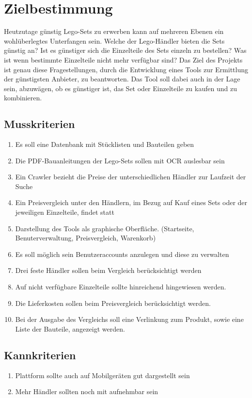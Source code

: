 \section{Zielbestimmung}

Heutzutage günstig Lego-Sets zu erwerben kann auf mehreren Ebenen ein wohlüberlegtes Unterfangen sein. Welche der Lego-Händler bieten die Sets günstig an? Ist es günstiger sich die Einzelteile des Sets einzeln zu bestellen? Was ist wenn bestimmte Einzelteile nicht mehr verfügbar sind? \newline
Das Ziel des Projekts ist genau diese Fragestellungen, durch die Entwicklung eines Tools zur Ermittlung der günstigsten Anbieter, zu beantworten. Das Tool soll dabei auch in der Lage sein, abzuwägen, ob es günstiger ist, das Set oder Einzelteile zu kaufen und zu kombinieren.

\subsection{Musskriterien}
\begin{enumerate}
\item Es soll eine Datenbank mit Stücklisten und Bauteilen geben
\item Die PDF-Bauanleitungen der Lego-Sets sollen mit OCR auslesbar sein
\item Ein Crawler bezieht die Preise der unterschiedlichen Händler zur Laufzeit der Suche
\item  Ein Preisvergleich unter den Händlern, im Bezug auf Kauf eines Sets oder der jeweiligen Einzelteile, findet statt
\item Darstellung des Tools als graphische Oberfläche. (Startseite, Benuterverwaltung, Preisvergleich, Warenkorb)
\item Es soll möglich sein Benutzeraccounts anzulegen und diese zu verwalten
\item Drei feste Händler sollen beim Vergleich berücksichtigt werden
\item Auf nicht verfügbare Einzelteile sollte hinreichend hingewiesen werden.
\item Die Lieferkosten sollen beim Preisvergleich berücksichtigt werden.
\item Bei der Ausgabe des Vergleichs soll eine Verlinkung zum Produkt, sowie eine Liste der Bauteile, angezeigt werden.
\end{enumerate}

\subsection{Kannkriterien}
\begin{enumerate}
\item Plattform sollte auch auf Mobilgeräten gut dargestellt sein
\item Mehr Händler sollten noch mit aufnehmbar sein
\end{enumerate}

